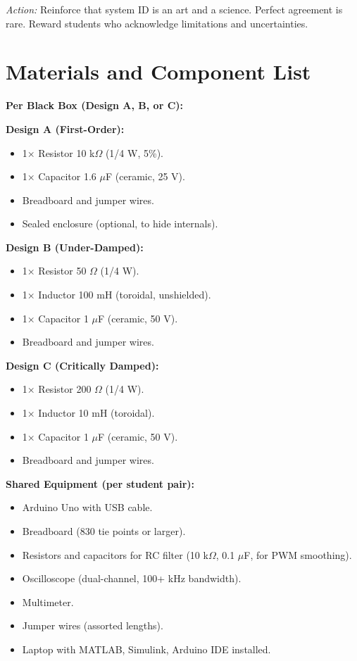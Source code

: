 \documentclass[11pt,letterpaper]{article}
\begin{document}
\noindent
\textit{Action:} Reinforce that system ID is an art and a science. Perfect agreement is rare. Reward students who acknowledge limitations and uncertainties.

\section{Materials and Component List}

\textbf{Per Black Box (Design A, B, or C):}

\noindent
\textbf{Design A (First-Order):}
\begin{itemize}
    \item 1× Resistor 10 k$\Omega$ (1/4 W, 5\%).
    \item 1× Capacitor 1.6 $\mu$F (ceramic, 25 V).
    \item Breadboard and jumper wires.
    \item Sealed enclosure (optional, to hide internals).
\end{itemize}

\noindent
\textbf{Design B (Under-Damped):}
\begin{itemize}
    \item 1× Resistor 50 $\Omega$ (1/4 W).
    \item 1× Inductor 100 mH (toroidal, unshielded).
    \item 1× Capacitor 1 $\mu$F (ceramic, 50 V).
    \item Breadboard and jumper wires.
\end{itemize}

\noindent
\textbf{Design C (Critically Damped):}
\begin{itemize}
    \item 1× Resistor 200 $\Omega$ (1/4 W).
    \item 1× Inductor 10 mH (toroidal).
    \item 1× Capacitor 1 $\mu$F (ceramic, 50 V).
    \item Breadboard and jumper wires.
\end{itemize}

\noindent
\textbf{Shared Equipment (per student pair):}
\begin{itemize}
    \item Arduino Uno with USB cable.
    \item Breadboard (830 tie points or larger).
    \item Resistors and capacitors for RC filter (10 k$\Omega$, 0.1 $\mu$F, for PWM smoothing).
    \item Oscilloscope (dual-channel, 100+ kHz bandwidth).
    \item Multimeter.
    \item Jumper wires (assorted lengths).
    \item Laptop with MATLAB, Simulink, Arduino IDE installed.
\end{itemize}
\end{document}
